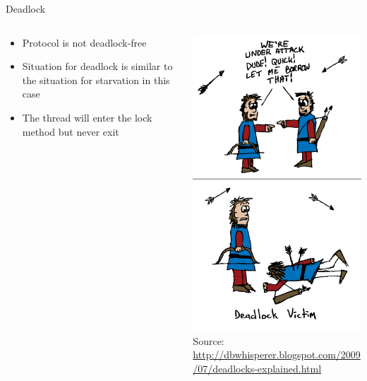 \begin{frame}{Deadlock}
  \begin{columns}[c]
    \begin{column}{0.6\textwidth}
      \begin{itemize}
      \item Protocol is not deadlock-free
      \item Situation for deadlock is similar to the situation for
        starvation in this case
      \item The thread will enter the lock method but never exit
      \end{itemize}
    \end{column}
    \begin{column}{0.4\textwidth}
      \begin{center}
        \includegraphics[width=\textwidth]{figures/deadlock}\\
        \tiny{Source: \url{http://dbwhisperer.blogspot.com/2009/07/deadlocks-explained.html}}
      \end{center}
    \end{column}
  \end{columns}
\end{frame}


